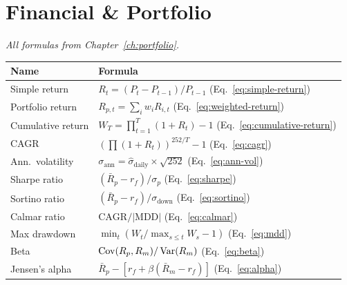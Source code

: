 \section{Financial \& Portfolio}

\noindent\textit{All formulas from Chapter~\ref{ch:portfolio}.}

\medskip

\begin{tabularx}{\textwidth}{lX}
\toprule
\textbf{Name} & \textbf{Formula} \\
\midrule
Simple return &
$R_t = (P_t - P_{t-1}) / P_{t-1}$
\quad (Eq.~\ref{eq:simple-return}) \\[8pt]

Portfolio return &
$R_{p,t} = \sum_i w_i R_{i,t}$
\quad (Eq.~\ref{eq:weighted-return}) \\[8pt]

Cumulative return &
$W_T = \prod_{t=1}^{T}(1+R_t) - 1$
\quad (Eq.~\ref{eq:cumulative-return}) \\[8pt]

CAGR &
$\left(\prod(1+R_t)\right)^{252/T} - 1$
\quad (Eq.~\ref{eq:cagr}) \\[8pt]

Ann.\ volatility &
$\sigma_{\text{ann}} = \hat{\sigma}_{\text{daily}} \times \sqrt{252}$
\quad (Eq.~\ref{eq:ann-vol}) \\[8pt]

Sharpe ratio &
$(\bar{R}_p - r_f) / \sigma_p$
\quad (Eq.~\ref{eq:sharpe}) \\[8pt]

Sortino ratio &
$(\bar{R}_p - r_f) / \sigma_{\text{down}}$
\quad (Eq.~\ref{eq:sortino}) \\[8pt]

Calmar ratio &
$\text{CAGR} / |\text{MDD}|$
\quad (Eq.~\ref{eq:calmar}) \\[8pt]

Max drawdown &
$\min_t (W_t / \max_{s \leq t} W_s - 1)$
\quad (Eq.~\ref{eq:mdd}) \\[8pt]

Beta &
$\operatorname{Cov}(R_p, R_m) / \operatorname{Var}(R_m)$
\quad (Eq.~\ref{eq:beta}) \\[8pt]

Jensen's alpha &
$\bar{R}_p - [r_f + \beta(\bar{R}_m - r_f)]$
\quad (Eq.~\ref{eq:alpha}) \\[8pt]


\end{tabularx}
